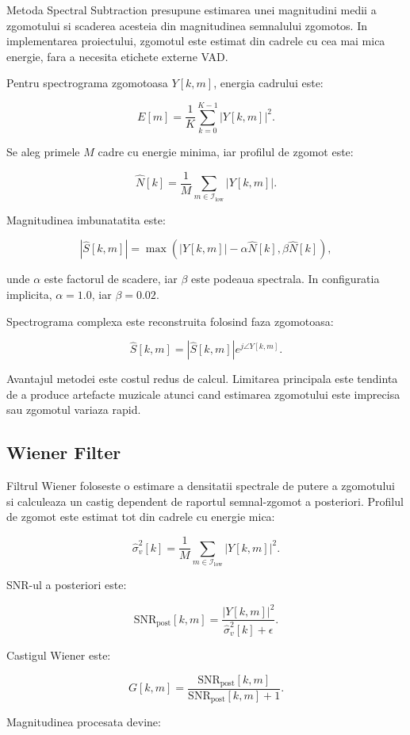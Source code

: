 Metoda Spectral Subtraction presupune estimarea unei magnitudini medii a
zgomotului si scaderea acesteia din magnitudinea semnalului zgomotos. In
implementarea proiectului, zgomotul este estimat din cadrele cu cea mai mica
energie, fara a necesita etichete externe VAD.

Pentru spectrograma zgomotoasa \(Y[k,m]\), energia cadrului este:

\[
E[m] = \frac{1}{K}\sum_{k=0}^{K-1}|Y[k,m]|^2.
\]

Se aleg primele \(M\) cadre cu energie minima, iar profilul de zgomot este:

\[
\hat{N}[k] =
\frac{1}{M}\sum_{m \in \mathcal{I}_{\text{low}}} |Y[k,m]|.
\]

Magnitudinea imbunatatita este:

\[
|\hat{S}[k,m]| =
\max\left(|Y[k,m]| - \alpha \hat{N}[k], \beta \hat{N}[k]\right),
\]

unde \(\alpha\) este factorul de scadere, iar \(\beta\) este podeaua spectrala.
In configuratia implicita, \(\alpha = 1.0\), iar \(\beta = 0.02\).

Spectrograma complexa este reconstruita folosind faza zgomotoasa:

\[
\hat{S}[k,m] = |\hat{S}[k,m]| e^{j\angle Y[k,m]}.
\]

Avantajul metodei este costul redus de calcul. Limitarea principala este
tendinta de a produce artefacte muzicale atunci cand estimarea zgomotului este
imprecisa sau zgomotul variaza rapid.

\subsection{Wiener Filter}

Filtrul Wiener foloseste o estimare a densitatii spectrale de putere a zgomotului
si calculeaza un castig dependent de raportul semnal-zgomot a posteriori.
Profilul de zgomot este estimat tot din cadrele cu energie mica:

\[
\hat{\sigma}_v^2[k] =
\frac{1}{M}\sum_{m \in \mathcal{I}_{\text{low}}} |Y[k,m]|^2.
\]

SNR-ul a posteriori este:

\[
\text{SNR}_{\text{post}}[k,m] =
\frac{|Y[k,m]|^2}{\hat{\sigma}_v^2[k] + \epsilon}.
\]

Castigul Wiener este:

\[
G[k,m] =
\frac{\text{SNR}_{\text{post}}[k,m]}
{\text{SNR}_{\text{post}}[k,m] + 1}.
\]

Magnitudinea procesata devine:

